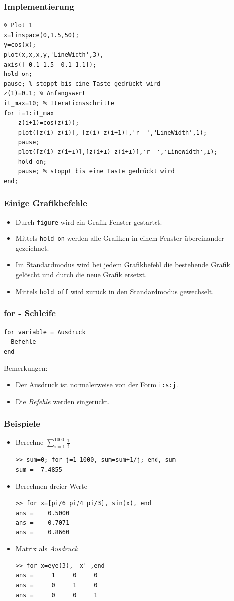 %
%
\begin{frame}[fragile]\frametitle{Implementierung}
\begin{lstlisting}
% Plot 1
x=linspace(0,1.5,50);
y=cos(x);
plot(x,x,x,y,'LineWidth',3),
axis([-0.1 1.5 -0.1 1.1]);
hold on;
pause; % stoppt bis eine Taste gedrückt wird
z(1)=0.1; % Anfangswert
it_max=10; % Iterationsschritte 
for i=1:it_max
    z(i+1)=cos(z(i));
    plot([z(i) z(i)], [z(i) z(i+1)],'r--','LineWidth',1);
    pause;
    plot([z(i) z(i+1)],[z(i+1) z(i+1)],'r--','LineWidth',1);
    hold on;
    pause; % stoppt bis eine Taste gedrückt wird
end;
\end{lstlisting}
\end{frame}
%
%
\begin{frame}[fragile]\frametitle{Einige Grafikbefehle}
\begin{itemize}
\item Durch \alert{ \lstinline!figure!} wird ein Grafik-Fenster gestartet.
\item Mittels \alert{ \lstinline!hold on!} werden alle Grafiken in einem Fenster
  \"ubereinander gezeichnet. 
\item Im Standardmodus wird bei jedem Grafikbefehl die bestehende Grafik
  gel\"oscht und durch die neue Grafik ersetzt.
\item Mittels \alert{ \lstinline!hold off!} wird zur\"uck in den Standardmodus
  gewechselt.  
\end{itemize}
\end{frame}
%
%
\begin{frame}[fragile]\frametitle{for - Schleife}
\begin{lstlisting}
for variable = Ausdruck
  Befehle
end
\end{lstlisting}
\alert{Bemerkungen:} 
\begin{itemize}
\item Der Ausdruck ist normalerweise von der Form
\lstinline!i:s:j!. 
\item Die {\it Befehle} werden eingerückt. 
\end{itemize}
\end{frame}
%
%
\begin{frame}[fragile]\frametitle{Beispiele}
\begin{itemize}
\item Berechne $\sum_{i=1}^{1000} \frac{1}{i}$
\begin{lstlisting}
>> sum=0; for j=1:1000, sum=sum+1/j; end, sum
sum =  7.4855
\end{lstlisting}
\item Berechnen dreier Werte
\begin{lstlisting}
>> for x=[pi/6 pi/4 pi/3], sin(x), end
ans =    0.5000
ans =    0.7071
ans =    0.8660
\end{lstlisting}
\item Matrix als {\it Ausdruck}
\begin{lstlisting}
>> for x=eye(3),  x' ,end
ans =     1     0     0
ans =     0     1     0
ans =     0     0     1
\end{lstlisting}
\end{itemize}
\end{frame}
